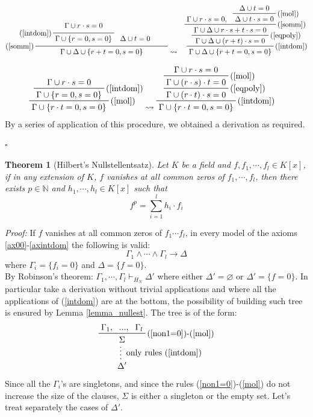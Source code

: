 \documentclass[a4paper,12pt,oneside]{book}
\newtheorem{theorem}{Theorem}[chapter]
\newcommand*{\QED}{\hfill\ensuremath{\square}}
\let\emptyset\varnothing
\let\e\wedge
\begin{document}
\begin{eqnarray*}
\prfrulenameskip=0.4em\prflinepadbefore=1ex
\prftree[l]{(\ref{somm})} { \prftree[l]{(\ref{intdom})} { \Gamma \cup  r\cdot s=0} { \Gamma \cup \{ r=0,s=0\} }  }{ \Delta \cup t=0 }
{\hspace{11mm}\Gamma \cup \Delta \cup\{r+t=0, s=0\}\hspace{11mm}}
& \leadsto
& \prftree[r]{(\ref{intdom})} 
{\prftree[r]{(\ref{eqpoly})}
{ 
\prftree[r]{(\ref{somm})}{\Gamma \cup r\cdot s=0,} 
{ \prftree[r]{(\ref{mol})} {\Delta \cup t=0  }  {\Delta \cup t\cdot s=0 }}
{\Gamma \cup \Delta \cup r\cdot s+t\cdot s=0 }
}
{\Gamma \cup \Delta \cup (r+t)\cdot s=0 }
}
{\Gamma \cup \Delta \cup\{r+t=0, s=0\}}
\end{eqnarray*}


\begin{eqnarray*}
\prftree[r]{(\ref{mol})} { \prftree[r]{(\ref{intdom})} {\Gamma \cup  r\cdot s=0} {\Gamma \cup  \{r=0, s=0\}} } {\Gamma \cup \{r\cdot t=0, s=0\}}
&  \leadsto 
\prftree[r]{(\ref{intdom})} 
{ \prftree[r]{(\ref{eqpoly})} 
{\prftree[r]{(\ref{mol})}
{\Gamma \cup r\cdot s=0}
{\Gamma\cup (r\cdot s) \cdot t=0 } } 
{\Gamma \cup  (r\cdot t) \cdot s=0} } 
{\Gamma \cup \{r\cdot t=0, s=0\}}
\end{eqnarray*}
By a series of application of this procedure, we obtained a derivation as required. 

\QED

\begin{theorem}[Hilbert's Nullstellentsatz]
Let $K$ be a field and $f,f_1,\cdots, f_l \in K[{x}]$, if in any extension of $K$, $f$ vanishes at all common zeros of $f_1,\cdots, f_l$, then there exists $p\in \mathbb{N}$ and $h_1,\cdots, h_l \in K[{x}]$ such that
$$
f^p = \sum_{i=1}^l h_i \cdot f_i
$$
\end{theorem}
\newpage
\textit{Proof: }If $f$ vanishes at all common zeros of $f_1\cdots f_l$, in every model of the axioms \ref{ax00}-\ref{axintdom} the following is valid:
$$ \Gamma_1\e\cdots\e\Gamma_l\rightarrow\Delta$$
where $\Gamma_i=\{f_i=0\}$ and $\Delta =\{f=0\}$.\\ By Robinson's theorem: $\Gamma_1,\cdots ,\Gamma_l \vdash_{H_N} \Delta '$ where either $\Delta '=\emptyset$ or $\Delta '=\{f=0\}$. 
In particular take a derivation without trivial applications and where all the applications of (\ref{intdom}) are at the bottom, the possibility of building such tree is ensured by Lemma \ref{lemma_nullest}. The tree is of the form:
\begin{equation*}
\prfsummary[only rules (\ref{intdom})] {\prftree[r]{(\ref{non1=0})-(\ref{mol})}{\Gamma_1,}{...,}{\Gamma_l}{\Sigma}}{\Delta '}
\end{equation*}
Since all the $\Gamma_i$'s are singletons, and since the rules (\ref{non1=0})-(\ref{mol}) do not increase the size of the clauses, $\Sigma$ is either a singleton or the empty set. Let's treat separately the cases of $\Delta '$.
\end{document}
